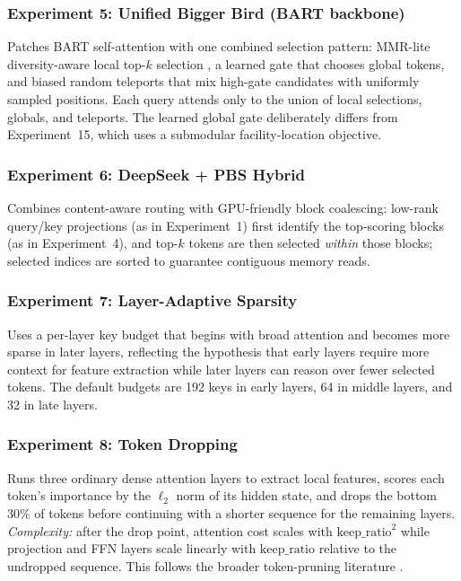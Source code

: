 \documentclass[11pt]{article}
\begin{document}
\subsubsection*{Experiment 5: Unified Bigger Bird (BART backbone)}
\label{exp:unified-bb}
Patches BART self-attention with one combined selection pattern: MMR-lite
diversity-aware local top-$k$ selection \citep{carbonell1998mmr}, a learned
gate that chooses global tokens, and biased random teleports that mix
high-gate candidates with uniformly sampled positions. Each query attends
only to the union of local selections, globals, and teleports. The learned
global gate deliberately differs from Experiment~15, which uses a submodular
facility-location objective.

\subsubsection*{Experiment 6: DeepSeek + PBS Hybrid}
\label{exp:deepseekpbs}
Combines content-aware routing with GPU-friendly block coalescing: low-rank
query/key projections (as in Experiment~1) first identify the top-scoring
blocks (as in Experiment~4), and top-$k$ tokens are then selected \emph{within}
those blocks; selected indices are sorted to guarantee contiguous memory
reads.

\subsubsection*{Experiment 7: Layer-Adaptive Sparsity}
\label{exp:layer-adaptive}
Uses a per-layer key budget that begins with broad attention and becomes more
sparse in later layers, reflecting the hypothesis that early layers require
more context for feature extraction while later layers can reason over fewer
selected tokens. The default budgets are 192 keys in early layers, 64 in
middle layers, and 32 in late layers.

\subsubsection*{Experiment 8: Token Dropping}
\label{exp:token-drop}
Runs three ordinary dense attention layers to extract local features, scores
each token's importance by the $\ell_2$ norm of its hidden state, and drops
the bottom 30\% of tokens before continuing with a shorter sequence for the
remaining layers. \emph{Complexity:} after the drop point, attention cost
scales with $\mathrm{keep\_ratio}^2$ while projection and FFN layers scale
linearly with $\mathrm{keep\_ratio}$ relative to the undropped sequence. This
follows the broader token-pruning literature \citep{goyal2020powerbert,kim2021tokenpruning}.
\end{document}
